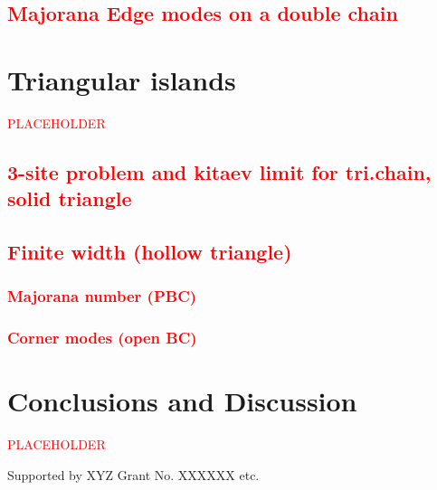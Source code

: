 \documentclass[aps,prb,showpacs,twocolumn,amsmath,amssymb,superscriptaddress]{revtex4-2}
\newcommand{\Red}[1]{\textcolor{red}{#1}}
\begin{document}
\subsection{\Red{Majorana Edge modes on a double chain}}

\section{Triangular islands}
\Red{PLACEHOLDER}
\subsection{\Red{3-site problem and kitaev limit for tri.chain, solid triangle}}

\subsection{\Red{Finite width (hollow triangle)}}

\subsubsection{\Red{Majorana number (PBC)}}

\subsubsection{\Red{Corner modes (open BC)}}

\section{Conclusions and Discussion}
\Red{PLACEHOLDER}


\begin{acknowledgements}
  Supported by XYZ Grant No. XXXXXX etc.
\end{acknowledgements}


%
\end{document}
